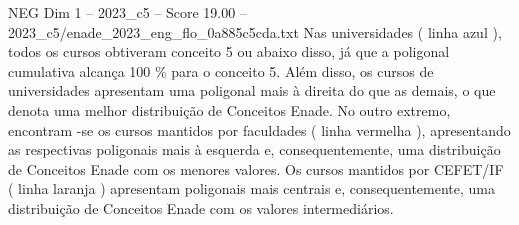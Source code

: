 \begin{textsample}{NEG Dim 1 – 2023\_c5 – Score 19.00 – 2023\_c5/enade\_2023\_eng\_flo\_0a885c5cda.txt}
Nas universidades ( linha azul ), todos os cursos obtiveram conceito 5 ou abaixo disso, já que a poligonal cumulativa alcança 100 \% para o conceito 5.
Além disso, os cursos de universidades apresentam uma poligonal mais à direita do que as demais, o que denota uma melhor distribuição de Conceitos Enade.
No outro extremo, encontram -se os cursos mantidos por faculdades ( linha vermelha ), apresentando as respectivas poligonais mais à esquerda e, consequentemente, uma distribuição de Conceitos Enade com os menores valores.
Os cursos mantidos por CEFET/IF ( linha laranja ) apresentam poligonais mais centrais e, consequentemente, uma distribuição de Conceitos Enade com os valores intermediários.

\end{textsample}
